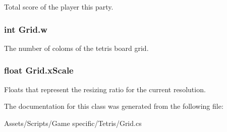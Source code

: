 Total score of the player this party. 

\hypertarget{class_grid_a66f83d135d340250e07d80e25ef727c6}{
\subsubsection[{w}]{\setlength{\rightskip}{0pt plus 5cm}int Grid.\-w}}\label{class_grid_a66f83d135d340250e07d80e25ef727c6}


The number of coloms of the tetris board grid. 

\hypertarget{class_grid_a0fbf74559ec1e8015a6a2ad71d40847c}{
\subsubsection[{x\-Scale}]{\setlength{\rightskip}{0pt plus 5cm}float Grid.\-x\-Scale}}\label{class_grid_a0fbf74559ec1e8015a6a2ad71d40847c}


Floats that represent the resizing ratio for the current resolution. 



The documentation for this class was generated from the following file\-:\begin{DoxyCompactItemize}
\item 
Assets/\-Scripts/\-Game specific/\-Tetris/Grid.\-cs\end{DoxyCompactItemize}
